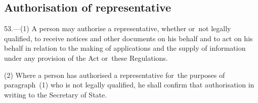 \documentclass[a4paper,12pt]{article}
\begin{document}
\subsection[53. Authorisation of representative]{Authorisation of representative}

53.—(1) A person may authorise a representative, whether or~not legally qualified, to receive notices and other documents on his behalf and to act on his behalf in relation to the making of applications and the supply of information under any provision of the Act or~these Regulations.

(2) Where a person has authorised a representative for~the purposes of paragraph~(1) who is not legally qualified, he shall confirm that authorisation in writing to the Secretary of State.

\end{document}
